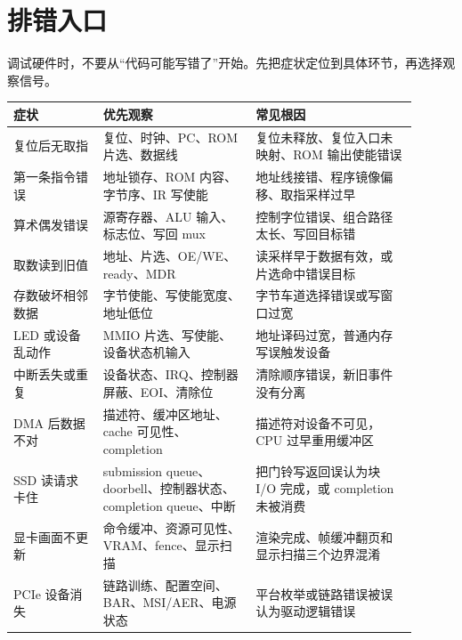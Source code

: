 \section*{排错入口}

调试硬件时，不要从“代码可能写错了”开始。先把症状定位到具体环节，再选择观察信号。

\begin{longtable}{p{0.2\linewidth}p{0.34\linewidth}p{0.36\linewidth}}
\toprule
症状 & 优先观察 & 常见根因 \\
\midrule
复位后无取指 & 复位、时钟、PC、ROM 片选、数据线 & 复位未释放、复位入口未映射、ROM 输出使能错误 \\
第一条指令错误 & 地址锁存、ROM 内容、字节序、IR 写使能 & 地址线接错、程序镜像偏移、取指采样过早 \\
算术偶发错误 & 源寄存器、ALU 输入、标志位、写回 mux & 控制字位错误、组合路径太长、写回目标错 \\
取数读到旧值 & 地址、片选、OE/WE、ready、MDR & 读采样早于数据有效，或片选命中错误目标 \\
存数破坏相邻数据 & 字节使能、写使能宽度、地址低位 & 字节车道选择错误或写窗口过宽 \\
LED 或设备乱动作 & MMIO 片选、写使能、设备状态机输入 & 地址译码过宽，普通内存写误触发设备 \\
中断丢失或重复 & 设备状态、IRQ、控制器屏蔽、EOI、清除位 & 清除顺序错误，新旧事件没有分离 \\
DMA 后数据不对 & 描述符、缓冲区地址、cache 可见性、completion & 描述符对设备不可见，CPU 过早重用缓冲区 \\
SSD 读请求卡住 & submission queue、doorbell、控制器状态、completion queue、中断 & 把门铃写返回误认为块 I/O 完成，或 completion 未被消费 \\
显卡画面不更新 & 命令缓冲、资源可见性、VRAM、fence、显示扫描 & 渲染完成、帧缓冲翻页和显示扫描三个边界混淆 \\
PCIe 设备消失 & 链路训练、配置空间、BAR、MSI/AER、电源状态 & 平台枚举或链路错误被误认为驱动逻辑错误 \\
\bottomrule
\end{longtable}

